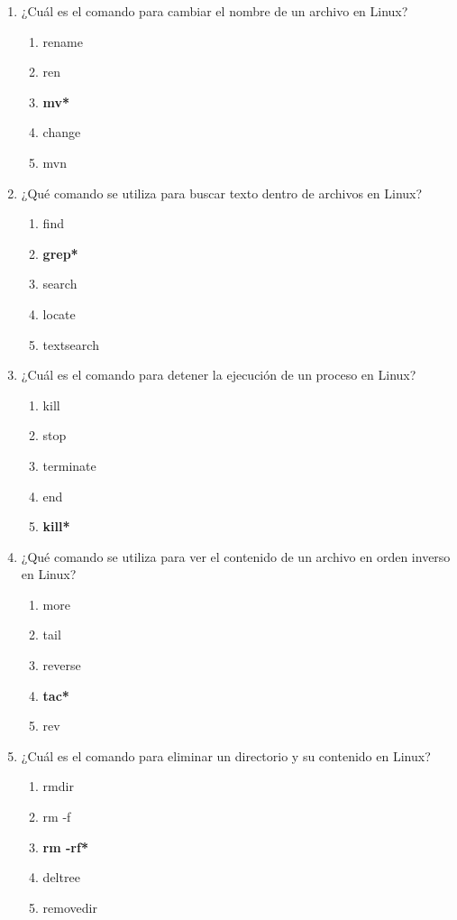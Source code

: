 \documentclass[11pt,twoside]{book}
\begin{document}
\begin{enumerate}[label=\textbf{\arabic*.}, leftmargin=2cm]
    \item ¿Cuál es el comando para cambiar el nombre de un archivo en Linux?
    \begin{enumerate}[label=\Alph*.]
        \item rename
        \item ren
        \item \textbf{mv*}
        \item change
        \item mvn
    \end{enumerate}

    \item ¿Qué comando se utiliza para buscar texto dentro de archivos en Linux?
    \begin{enumerate}[label=\Alph*.]
        \item find
        \item \textbf{grep*}
        \item search
        \item locate
        \item textsearch
    \end{enumerate}

    \item ¿Cuál es el comando para detener la ejecución de un proceso en Linux?
    \begin{enumerate}[label=\Alph*.]
        \item kill
        \item stop
        \item terminate
        \item end
        \item \textbf{kill*}
    \end{enumerate}

    \item ¿Qué comando se utiliza para ver el contenido de un archivo en orden inverso en Linux?
    \begin{enumerate}[label=\Alph*.]
        \item more
        \item tail
        \item reverse
        \item \textbf{tac*}
        \item rev
    \end{enumerate}

    \item ¿Cuál es el comando para eliminar un directorio y su contenido en Linux?
    \begin{enumerate}[label=\Alph*.]
        \item rmdir
        \item rm -f
        \item \textbf{rm -rf*}
        \item deltree
        \item removedir
    \end{enumerate}


\end{enumerate}
\end{document}

